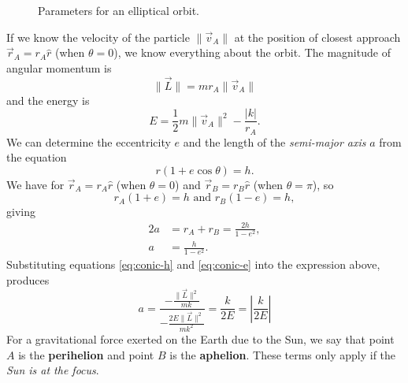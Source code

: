 \begin{figure}[h!]
    \centering
    \caption{Parameters for an elliptical orbit.}
\end{figure}
\FloatBarrier

If we know the velocity of the particle $\| \vec{v}_A \|$ at the position of closest approach $\vec{r}_A = r_A \hat{r}$ (when $\theta = 0$), we know everything about the orbit. The magnitude of angular momentum is
\begin{equation}
   \| \vec{L} \| = m r_A \| \vec{v}_A \| 
\end{equation}
and the energy is
\begin{equation}
    E = \frac{1}{2}m \| \vec{v}_A \|^2 - \frac{|k|}{r_A}.
\end{equation}
We can determine the eccentricity $e$ and the length of the \textit{semi-major axis} $a$ from the equation
\begin{equation*}
    r(1 + e \cos \theta) = h.
\end{equation*}
We have for $\vec{r}_A = r_A \hat{r}$ (when $\theta = 0$) and $\vec{r}_B = r_B \hat{r}$ (when $\theta = \pi$), so
\begin{equation}
    r_A(1 + e) = h \text{ and } r_B (1- e) = h,
\end{equation}
giving
\begin{align}
    2a &= r_A + r_B = \frac{2h}{1-e^2}, \\
    a &= \frac{h}{1-e^2}.
\end{align}
Substituting equations \ref{eq:conic-h} and \ref{eq:conic-e} into the expression above, produces
\begin{equation}
    a = \frac{- \frac{\| \vec{L} \|^2}{mk}}{- \frac{2E\| \vec{L} \|^2}{mk^2}} = \frac{k}{2E} = \left| \frac{k}{2E} \right|
\end{equation}
For a gravitational force exerted on the Earth due to the Sun, we say that point $A$ is the \textbf{perihelion} and point $B$ is the \textbf{aphelion}. These terms only apply if the \textit{Sun is at the focus}.

